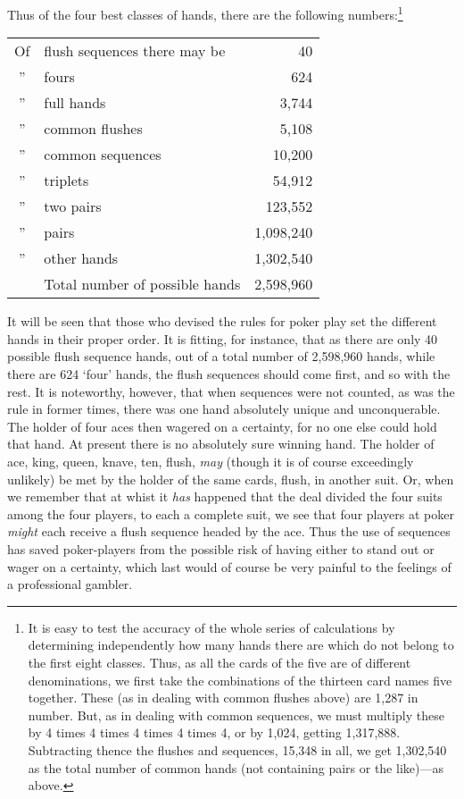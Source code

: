 \documentclass[letterpaper,12pt,oneside,openany]{memoir}
\begin{document}
Thus of the four best classes of hands, there are
the following
numbers:\footnote{It is easy to test the accuracy of the whole series of
calculations by determining independently how many hands there are which
do not belong to the first eight classes. Thus, as all the cards of the
five are of different denominations, we first take the combinations
of the thirteen card names five together. These (as in dealing with
common flushes above) are 1,287 in number. But, as in dealing
with common sequences, we must multiply these by 4 times 4 times
4 times 4 times 4, or by 1,024, getting 1,317,888. Subtracting thence
the flushes and sequences, 15,348 in all, we get 1,302,540 as the total
number of common hands (not containing pairs or the like)---as
above.}

\begin{tabular}{c@{\ }lr}
  Of & flush sequences there may be \qquad\qquad   &        40  \\
  '' & fours                                       &       624  \\
  '' & full hands                                  &     3,744  \\
  '' & common flushes                              &     5,108  \\
  '' & common sequences                            &    10,200  \\
  '' & triplets                                    &    54,912  \\
  '' & two pairs                                   &   123,552  \\
  '' & pairs                                       & 1,098,240  \\
  '' & other hands                                 & 1,302,540  \\
\cline{3-3}
     & Total number of possible hands \qquad\qquad & 2,598,960
\end{tabular}

It will be seen that those who devised the rules for
poker play set the different hands in their proper order.
It is fitting, for instance, that as there are only 40
possible flush sequence hands, out of a total number of
2,598,960 hands, while there are 624 `four' hands, the
flush sequences should come first, and so with the rest.
It is noteworthy, however, that when sequences were
not counted, as was the rule in former times, there was
one hand absolutely unique and unconquerable. The
holder of four aces then wagered on a certainty, for no
one else could hold that hand. At present there is no
absolutely sure winning hand. The holder of ace, king,
queen, knave, ten, flush, \emph{may} (though it is of course exceedingly
unlikely) be met by the holder of the same
cards, flush, in another suit. Or, when we remember
that at whist it \emph{has} happened that the deal divided the
four suits among the four players, to each a complete
suit, we see that four players at poker \emph{might} each receive
a flush sequence headed by the ace. Thus the use
of sequences has saved poker-players from the possible
risk of having either to stand out or wager on a certainty,
which last would of course be very painful to the
feelings of a professional gambler.
\end{document}
